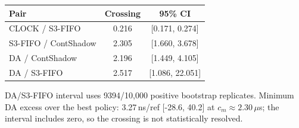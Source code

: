\begin{table}[t]
\begin{tabular}{@{}lcc@{}}
\toprule
Pair & Crossing & 95\% CI \\
\midrule
CLOCK / S3-FIFO & 0.216 & [0.171, 0.274] \\
S3-FIFO / ContShadow & 2.305 & [1.660, 3.678] \\
DA / ContShadow & 2.196 & [1.449, 4.105] \\
DA / S3-FIFO & 2.517 & [1.086, 22.051] \\
\bottomrule
\end{tabular}
\par\smallskip
\footnotesize DA/S3-FIFO interval uses 9394/10{,}000 positive bootstrap replicates. Minimum DA excess over the best policy: 3.27\,ns/ref [-28.6, 40.2] at $c_m\approx2.30\,\mu$s; the interval includes zero, so the crossing is not statistically resolved.
\end{table}
